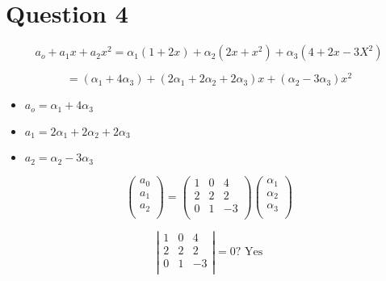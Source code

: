 \documentclass[12pt, a4paper]{report}
\theoremstyle{plain}
\theoremstyle{definition}
\theoremstyle{remark}
\begin{document}
\newpage
{\Large
\section*{Question 4}
\[a_o + a_1x + a_2x^2 = \alpha_1(1+2x) + \alpha_2(2x+x^2)+\alpha_3(4+2x-3X^2)\]

\[=(\alpha_1+4\alpha_3) + (2\alpha_1 + 2\alpha_2 + 2\alpha_3)x + (\alpha_2-3\alpha_3)x^2\]

\begin{itemize}
\item $a_o =  \alpha_1+4\alpha_3$
\item $a_1 = 2\alpha_1 + 2\alpha_2 + 2\alpha_3$
\item $a_2 = \alpha_2-3\alpha_3$
\end{itemize}

\[\left(\begin{array}{ccc}
 a_0\\
 a_1\\
 a_2\\
\end{array}\right)= \left(\begin{array}{ccc}
1 &0& 4\\
2 &2& 2\\
0 &1& -3\\
\end{array}\right)
\left( \begin{array}{ccc}
 \alpha_1\\
 \alpha_2\\
 \alpha_3\\
\end{array}\right)\]

\[
\left|\begin{array}{ccc}
1 &0& 4\\
2 &2& 2\\
0 &1& -3\\
\end{array}\right| =0? \mbox{    Yes}\]
}
\end{document}
